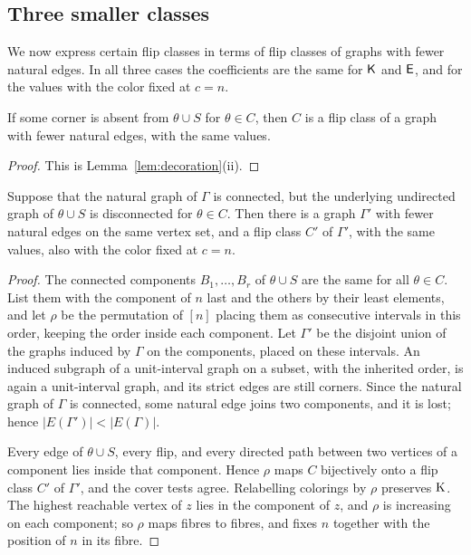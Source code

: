 \subsection{Three smaller classes}

We now express certain flip classes in terms of flip classes of graphs with
fewer natural edges.
In all three cases the coefficients are the same for $\mathsf{K}$ and $\mathsf{E}$, and for
the values with the color fixed at $c=n$.

\begin{lemma}\label{lem:absentCorner}
If some corner is absent from $\theta\cup S$ for $\theta\in C$, then $C$ is a
flip class of a graph with fewer natural edges, with the same values.
\end{lemma}

\begin{proof}
This is Lemma~\ref{lem:decoration}(ii).
\end{proof}

\begin{lemma}\label{lem:disconnected}
Suppose that the natural graph of $\Gamma$ is connected, but the underlying
undirected graph of $\theta\cup S$ is disconnected for $\theta\in C$.
Then there is a graph $\Gamma'$ with fewer natural edges on the same vertex
set, and a flip class $C'$ of $\Gamma'$, with the same values, also with the
color fixed at $c=n$.
\end{lemma}

\begin{proof}
The connected components $B_1,\dotsc,B_r$ of $\theta\cup S$ are the same for
all $\theta\in C$.
List them with the component of $n$ last and the others by their least
elements, and let $\rho$ be the permutation of $[n]$ placing them as consecutive
intervals in this order, keeping the order inside each component.
Let $\Gamma'$ be the disjoint union of the graphs induced by $\Gamma$ on the
components, placed on these intervals.
An induced subgraph of a unit-interval graph on a subset, with the inherited
order, is again a unit-interval graph, and its strict edges are still corners.
Since the natural graph of $\Gamma$ is connected, some natural edge joins two
components, and it is lost; hence $|E(\Gamma')|<|E(\Gamma)|$.

Every edge of $\theta\cup S$, every flip, and every directed path between two
vertices of a component lies inside that component.
Hence $\rho$ maps $C$ bijectively onto a flip class $C'$ of $\Gamma'$, and the
cover tests agree.
Relabelling colorings by $\rho$ preserves $\mathrm{K}$.
The highest reachable vertex of $z$ lies in the component of $z$, and $\rho$ is
increasing on each component; so $\rho$ maps fibres to fibres, and fixes $n$
together with the position of $n$ in its fibre.
\end{proof}

